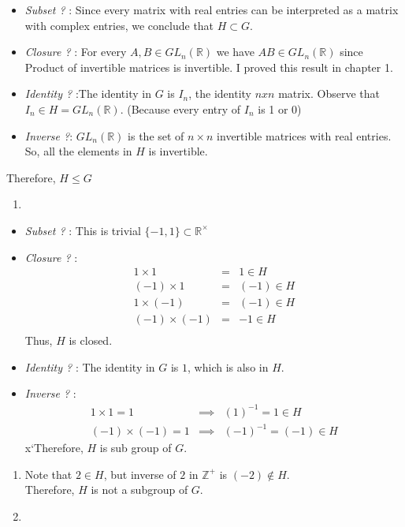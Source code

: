 \documentclass[
]{book}
\providecommand{\tightlist}{%
  \setlength{\itemsep}{0pt}\setlength{\parskip}{0pt}}
\begin{document}
\begin{itemize}
\item
  \emph{Subset ?} : Since every matrix with real entries can be
  interpreted as a matrix with complex entries, we conclude that
  \(H \subset G\).
\item
  \emph{Closure ?} : For every \(A, B \in GL_n(\mathbb{R})\) we have
  \(AB \in GL_n(\mathbb{R})\) since Product of invertible matrices is
  invertible. I proved this result in chapter 1.
\item
  \emph{Identity ?} :The identity in \(G\) is \(I_n\), the identity
  \(n x n\) matrix. Observe that \(I_n\in H=GL_n(\mathbb{R})\). (Because
  every entry of \(I_n\) is 1 or 0)
\item
  \emph{Inverse ?}: \(GL_n(\mathbb{R})\) is the set of \(n \times n\)
  invertible matrices with real entries. So, all the elements in \(H\)
  is invertible.
\end{itemize}

Therefore, \(H \leq G\)

\begin{enumerate}
\def\labelenumi{(\alph{enumi})}
\setcounter{enumi}{1}
\tightlist
\item
\end{enumerate}

\begin{itemize}
\item
  \emph{Subset ?} : This is trivial
  \(\{-1,1\}\subset \mathbb{R}^\times\)
\item
  \emph{Closure ?} : \begin{eqnarray}
  1 \times 1 &=& 1\in H\\
  (-1) \times 1 &=& (-1)\in H\\
  1 \times (-1) &=& (-1)\in H\\
  (-1) \times (-1) &=& -1\in H\\
  \end{eqnarray} Thus, \(H\) is closed.
\item
  \emph{Identity ?} : The identity in \(G\) is \(1\), which is also in
  \(H\).
\item
  \emph{Inverse ?} : \begin{eqnarray}
  1 \times 1 = 1   &\implies & (1)^{-1}=1\in H\\
  (-1) \times (-1) = 1 &\implies & (-1)^{-1}=(-1)\in H
  \end{eqnarray} x`Therefore, \(H\) is sub group of \(G\).
\end{itemize}

\begin{enumerate}
\def\labelenumi{(\alph{enumi})}
\setcounter{enumi}{2}
\item
  Note that \(2\in H\), but inverse of \(2\) in \(\mathbb{Z}^+\) is
  \((-2) \not \in H\).\\
  Therefore, \(H\) is not a subgroup of \(G\).
\item
\end{enumerate}
\end{document}
